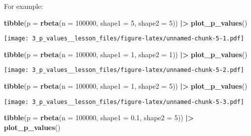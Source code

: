 \documentclass[
]{article}
\newenvironment{Shaded}{\begin{snugshade}}{\end{snugshade}}
\newcommand{\AttributeTok}[1]{\textcolor[rgb]{0.13,0.29,0.53}{#1}}
\newcommand{\DecValTok}[1]{\textcolor[rgb]{0.00,0.00,0.81}{#1}}
\newcommand{\FloatTok}[1]{\textcolor[rgb]{0.00,0.00,0.81}{#1}}
\newcommand{\FunctionTok}[1]{\textcolor[rgb]{0.13,0.29,0.53}{\textbf{#1}}}
\newcommand{\NormalTok}[1]{#1}
\newcommand{\SpecialCharTok}[1]{\textcolor[rgb]{0.81,0.36,0.00}{\textbf{#1}}}
\begin{document}
For example:

\begin{Shaded}
\begin{Highlighting}[]
\FunctionTok{tibble}\NormalTok{(}\AttributeTok{p =} \FunctionTok{rbeta}\NormalTok{(}\AttributeTok{n =} \DecValTok{100000}\NormalTok{, }\AttributeTok{shape1 =} \DecValTok{5}\NormalTok{, }\AttributeTok{shape2 =} \DecValTok{5}\NormalTok{)) }\SpecialCharTok{|\textgreater{}}
  \FunctionTok{plot\_p\_values}\NormalTok{()}
\end{Highlighting}
\end{Shaded}

\texttt{[image: 3\_p\_values\_\_lesson\_files/figure-latex/unnamed-chunk-5-1.pdf]}

\begin{Shaded}
\begin{Highlighting}[]
\FunctionTok{tibble}\NormalTok{(}\AttributeTok{p =} \FunctionTok{rbeta}\NormalTok{(}\AttributeTok{n =} \DecValTok{100000}\NormalTok{, }\AttributeTok{shape1 =} \DecValTok{1}\NormalTok{, }\AttributeTok{shape2 =} \DecValTok{1}\NormalTok{)) }\SpecialCharTok{|\textgreater{}}
  \FunctionTok{plot\_p\_values}\NormalTok{()}
\end{Highlighting}
\end{Shaded}

\texttt{[image: 3\_p\_values\_\_lesson\_files/figure-latex/unnamed-chunk-5-2.pdf]}

\begin{Shaded}
\begin{Highlighting}[]
\FunctionTok{tibble}\NormalTok{(}\AttributeTok{p =} \FunctionTok{rbeta}\NormalTok{(}\AttributeTok{n =} \DecValTok{100000}\NormalTok{, }\AttributeTok{shape1 =} \DecValTok{1}\NormalTok{, }\AttributeTok{shape2 =} \DecValTok{5}\NormalTok{)) }\SpecialCharTok{|\textgreater{}}
  \FunctionTok{plot\_p\_values}\NormalTok{()}
\end{Highlighting}
\end{Shaded}

\texttt{[image: 3\_p\_values\_\_lesson\_files/figure-latex/unnamed-chunk-5-3.pdf]}

\begin{Shaded}
\begin{Highlighting}[]
\FunctionTok{tibble}\NormalTok{(}\AttributeTok{p =} \FunctionTok{rbeta}\NormalTok{(}\AttributeTok{n =} \DecValTok{100000}\NormalTok{, }\AttributeTok{shape1 =} \FloatTok{0.1}\NormalTok{, }\AttributeTok{shape2 =} \DecValTok{5}\NormalTok{)) }\SpecialCharTok{|\textgreater{}}
  \FunctionTok{plot\_p\_values}\NormalTok{()}
\end{Highlighting}
\end{Shaded}
\end{document}

